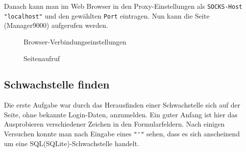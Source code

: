 \documentclass[12pt,a4paper,titlepage,oneside]{scrartcl}
\begin{document}
Danach kann man im Web Browser in den Proxy-Einstellungen als \lstinline{SOCKS-Host "localhost"} und den gewählten \lstinline{Port} eintragen. Nun kann die Seite (Manager9000) aufgerufen werden.

\begin{figure}[h!]
  \centering
  \caption{Browser-Verbindungseinstellungen}
  \label{fig:proxy}
\end{figure}

\begin{figure}[h!]
  \centering
  \caption{Seitenaufruf}
  \label{fig:enterSite}
\end{figure}

\pagebreak

\subsection{Schwachstelle finden}

Die erste Aufgabe war durch das Herausfinden einer Schwachstelle sich auf der Seite, ohne bekannte Login-Daten, anzumelden.
Ein guter Anfang ist hier das Ausprobieren verschiedener Zeichen in den Formularfeldern. Nach einigen Versuchen konnte man nach Eingabe eines \lstinline{"'"} sehen, dass es sich anscheinend um eine SQL(SQLite)-Schwachstelle handelt.
\end{document}
